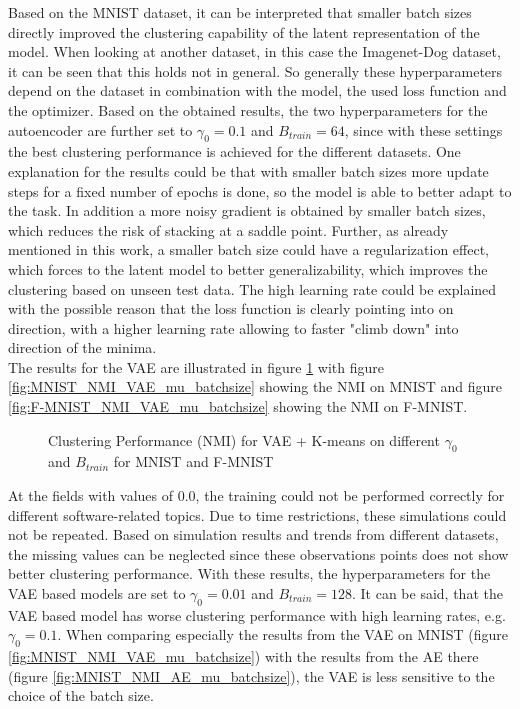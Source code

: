 \documentclass[12pt,DIV14,BCOR12mm,a4paper,footexclude,headinclude,halfparskip-,twoside,openright,cleardoubleempty,idxtotoc,bibtotoc,listtotoc,abstracton]{scrreprt} %
\numberwithin{equation}{chapter}
\begin{document}
Based on the MNIST dataset, it can be interpreted that smaller batch sizes directly improved the clustering capability of the latent representation of the model. When looking at another dataset, in this case the Imagenet-Dog dataset, it can be seen that this holds not in general. So generally these hyperparameters depend on the dataset in combination with the model, the used loss function and the optimizer. Based on the obtained results, the two hyperparameters for the autoencoder are further set to $\gamma_0=0.1$ and $B_{train}=64$, since with these settings the best clustering performance is achieved for the different datasets. One explanation for the results could be that with smaller batch sizes more update steps for a fixed number of epochs is done, so the model is able to better adapt to the task. In addition a more noisy gradient is obtained by smaller batch sizes, which reduces the risk of stacking at a saddle point. Further, as already mentioned in this work, a smaller batch size could have a regularization effect, which forces to the latent model to better generalizability, which improves the clustering based on unseen test data. The high learning rate could be explained with the possible reason that the loss function is clearly pointing into on direction, with a higher learning rate allowing to faster "climb down" into direction of the minima.\\
The results for the VAE are illustrated in figure \ref{fig:ClusterPerformance_VAE_LearningRate_BatchSize} with figure \ref{fig:MNIST_NMI_VAE_mu_batchsize} showing the NMI on MNIST and figure \ref{fig:F-MNIST_NMI_VAE_mu_batchsize} showing the NMI on F-MNIST.
	 \begin{figure}[htb!]
		\centering
		\qquad
		\caption{Clustering Performance (NMI) for VAE + K-means on different $\gamma_0$ and $B_{train}$ for MNIST and F-MNIST}
		\label{fig:ClusterPerformance_VAE_LearningRate_BatchSize}
	\end{figure}
At the fields with values of $0.0$, the training could not be performed correctly for different software-related topics. Due to time restrictions, these simulations could not be repeated. Based on simulation results and trends from different datasets, the missing values can be neglected since these observations points does not show better clustering performance. With these results, the hyperparameters for the VAE based models are set to $\gamma_0=0.01$ and $B_{train}=128$. It can be said, that the VAE based model has worse clustering performance with high learning rates, e.g. $\gamma_0=0.1$. When comparing especially the results from the VAE on MNIST (figure \ref{fig:MNIST_NMI_VAE_mu_batchsize}) with the results from the AE there (figure \ref{fig:MNIST_NMI_AE_mu_batchsize}), the VAE is less sensitive to the choice of the batch size.\\
\end{document}
